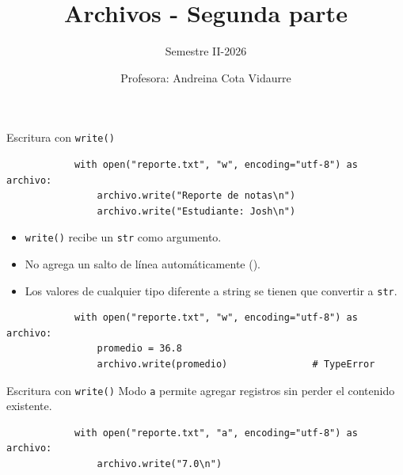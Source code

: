 \documentclass{beamer}
\title{Archivos - Segunda parte} %
\subtitle{Semestre II-2026} %
\author{Profesora: Andreina Cota Vidaurre}
\begin{document}
  \shorthandoff{-}
  \frame[c]{\maketitle}

    \begin{frame}[fragile, t]{Escritura con \texttt{write()}}
        \begin{verbatim}
            with open("reporte.txt", "w", encoding="utf-8") as archivo:
                archivo.write("Reporte de notas\n")
                archivo.write("Estudiante: Josh\n")
        \end{verbatim}

        \begin{itemize}
            \item \texttt{write()} recibe un \texttt{str} como argumento.
            \item No agrega un salto de línea automáticamente (\texttt{\n}).
            \item Los valores de cualquier tipo diferente a string se tienen que convertir a \texttt{str}.
        \end{itemize}

        \begin{verbatim}
            with open("reporte.txt", "w", encoding="utf-8") as archivo:
                promedio = 36.8
                archivo.write(promedio)               # TypeError
        \end{verbatim}
    \end{frame}

    \begin{frame}[fragile, t]{Escritura con \texttt{write()}}
        Modo \texttt{a} permite agregar registros sin perder el contenido existente.

        \begin{verbatim}
            with open("reporte.txt", "a", encoding="utf-8") as archivo:
                archivo.write("7.0\n")
        \end{verbatim}
    \end{frame}
\end{document}
